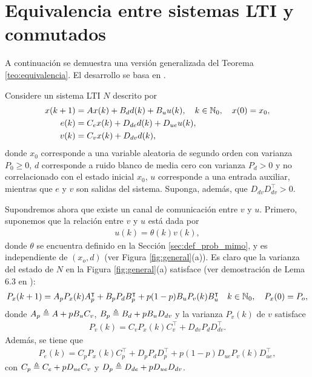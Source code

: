\section{Equivalencia entre sistemas LTI y conmutados}\label{ap:demo-teo1}

A continuaci\'on se demuestra una versi\'on generalizada del Teorema \ref{teo:equivalencia}. El desarrollo se basa en \cite{sebatesis}.

Considere un sistema LTI $N$ descrito por
\begin{align}
x(k+1) & = A x(k) + B_d d(k) + B_u u(k), \quad k\in \mathbb{N}_0, \quad x(0)=x_0, \\
  e(k) & = C_e x(k) + D_{de} d(k) + D_{ue} u(k), \\
  v(k) & = C_v x(k) + D_{dv} d(k),
\end{align}
donde $x_0$ corresponde a una variable aleatoria de segundo orden con varianza $P_0\geq 0$, $d$ corresponde a ruido blanco de media cero con varianza $P_d>0$ y no correlacionado con el estado inicial $x_0$, $u$ corresponde a una entrada auxiliar, mientras que $e$ y $v$ son salidas del sistema. Suponga, adem\'as, que $D_{dv}D_{dv}^{\intercal}>0$.

Supondremos ahora que existe un canal de comunicaci\'on entre $v$ y $u$. Primero, suponemos que la relaci\'on entre $v$ y $u$ est\'a dada por
\begin{align}\label{eq:erasure-apendix}
u(k) = \theta(k) v(k),
\end{align}
donde $\theta$ se encuentra definido en la Secci\'on \ref{sec:def_prob_mimo}, y es independiente de $(x_o,d)$ (ver Figura \ref{fig:general}(a)). Es claro que la varianza del estado de $N$ en la Figura \ref{fig:general}(a) satisface (ver demostraci\'on de Lema 6.3 en \cite{elia05}):
\begin{align}\label{eq:Px}
P_x(k+1) = A_pP_x(k)A_p^{\intercal} + B_pP_dB_p^{\intercal} + p(1-p)B_uP_v(k) B_u^{\intercal} \quad k\in\mathbb{N}_0, \quad P_x(0)=P_o,
\end{align}
donde $A_p\triangleq A+pB_uC_v$, $B_p\triangleq B_d + pB_uD_{dv}$ y la varianza $P_v(k)$ de $v$ satisface
\begin{align}\label{eq:Pv}
P_v(k) = C_v P_x(k) C_v^{\intercal} + D_{dv} P_d D_{dv}^{\intercal}.
\end{align}
Adem\'as, se tiene que
\begin{align}\label{eq:Pe}
P_e(k) = C_p P_x(k) C_p^{\intercal} + D_p P_d D_p^{\intercal} + p(1-p) D_{ue} P_v(k) D_{ue}^{\intercal},
\end{align}
con $C_p\triangleq C_e+pD_{ue}C_v$ y $D_p\triangleq D_{de} +pD_{ue}D_{dv}$.

